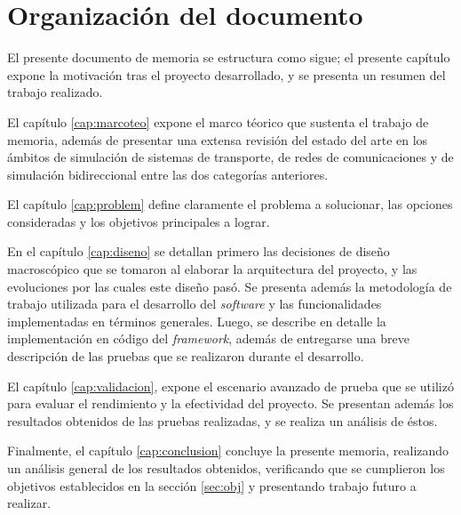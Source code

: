 \section{Organización del documento}

El presente documento de memoria se estructura como sigue; el presente capítulo expone la motivación tras el proyecto desarrollado, y se presenta un resumen del trabajo realizado.

El capítulo \ref{cap:marcoteo} expone el marco téorico que sustenta el trabajo de memoria, además de presentar una extensa revisión del estado del arte en los ámbitos de simulación de sistemas de transporte, de redes de comunicaciones y de simulación bidireccional entre las dos categorías anteriores.

El capítulo \ref{cap:problem} define claramente el problema a solucionar, las opciones consideradas y los objetivos principales a lograr.

En el capítulo \ref{cap:diseno} se detallan primero las decisiones de diseño macroscópico que se tomaron al elaborar la arquitectura del proyecto, y las evoluciones por las cuales este diseño pasó. Se presenta además la metodología de trabajo utilizada para el desarrollo del \emph{software} y las funcionalidades implementadas en términos generales. Luego, se describe en detalle la implementación en código del \emph{framework}, además de entregarse una breve descripción de las pruebas que se realizaron durante el desarrollo.

El capítulo \ref{cap:validacion}, expone el escenario avanzado de prueba que se utilizó para evaluar el rendimiento y la efectividad del proyecto. Se presentan además los resultados obtenidos de las pruebas realizadas, y se realiza un análisis de éstos.

Finalmente, el capítulo \ref{cap:conclusion} concluye la presente memoria, realizando un análisis general de los resultados obtenidos, verificando que se cumplieron los objetivos establecidos en la sección \ref{sec:obj} y presentando trabajo futuro a realizar.

